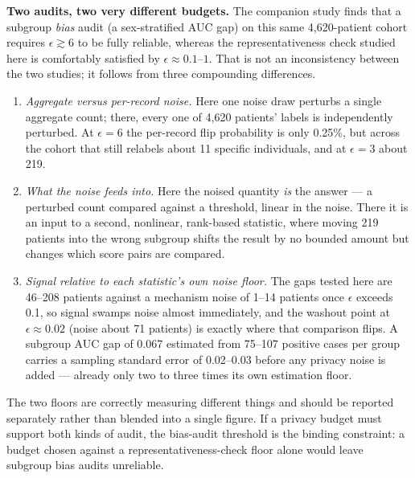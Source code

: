 \documentclass[11pt]{article}
\begin{document}
\textbf{Two audits, two very different budgets.} The companion study finds that a subgroup \emph{bias} audit (a sex-stratified AUC gap) on this same 4,620-patient cohort requires $\epsilon \gtrsim 6$ to be fully reliable, whereas the representativeness check studied here is comfortably satisfied by $\epsilon \approx 0.1$--$1$. That is not an inconsistency between the two studies; it follows from three compounding differences.

\begin{enumerate}\itemsep0.2em
\item \emph{Aggregate versus per-record noise.} Here one noise draw perturbs a single aggregate count; there, every one of 4,620 patients' labels is independently perturbed. At $\epsilon = 6$ the per-record flip probability is only 0.25\%, but across the cohort that still relabels about 11 specific individuals, and at $\epsilon = 3$ about 219.
\item \emph{What the noise feeds into.} Here the noised quantity \emph{is} the answer --- a perturbed count compared against a threshold, linear in the noise. There it is an input to a second, nonlinear, rank-based statistic, where moving 219 patients into the wrong subgroup shifts the result by no bounded amount but changes which score pairs are compared.
\item \emph{Signal relative to each statistic's own noise floor.} The gaps tested here are 46--208 patients against a mechanism noise of 1--14 patients once $\epsilon$ exceeds 0.1, so signal swamps noise almost immediately, and the washout point at $\epsilon \approx 0.02$ (noise about 71 patients) is exactly where that comparison flips. A subgroup AUC gap of 0.067 estimated from 75--107 positive cases per group carries a sampling standard error of 0.02--0.03 before any privacy noise is added --- already only two to three times its own estimation floor.
\end{enumerate}

The two floors are correctly measuring different things and should be reported separately rather than blended into a single figure. If a privacy budget must support both kinds of audit, the bias-audit threshold is the binding constraint: a budget chosen against a representativeness-check floor alone would leave subgroup bias audits unreliable.
\end{document}
